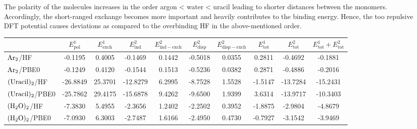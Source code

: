 \documentclass[a4paper,12pt, parskip=half]{scrartcl}
\newcommand{\m}[1]{\mathrm{#1}}
\begin{document}
The polarity of the molecules increases in the order argon < water < uracil leading to shorter distances between the monomers. Accordingly, the short-ranged exchange becomes more important and heavily contributes to the binding energy. Hence, the too repulsive DFT potential causes deviations as compared to the overbinding HF in the above-mentioned order.
%
\begin{table}
	\centering
	\label{tab:noncov}
	\begin{adjustbox}{width=\columnwidth,center}
		\begin{tabular}{l|ccccccccc}
			\toprule
			                        & $ E^1_\m{pol} $ & $ E^1_\m{exch} $ & $ E^2_\m{ind} $ & $ E^2_\m{ind-exch} $ & $ E^2_\m{disp} $ & $ E^2_\m{disp-exch} $ & $ E^1_\m{tot} $ & $ E^2_\m{tot} $ & $ E^1_\m{tot} + E^2_\m{tot} $ \\
			\midrule
			$ \ce{Ar2} $/HF         & -0.1195         & 0.4005           & -0.1469         & 0.1442               & -0.5018          & 0.0355                & 0.2811          & -0.4692         & -0.1881                       \\
			$ \ce{Ar2} $/PBE0       & -0.1249         & 0.4120           & -0.1544         & 0.1513               & -0.5236          & 0.0382                & 0.2871          & -0.4886         & -0.2016                       \\
			$ \ce{(Uracil)2} $/HF   & -26.8849        & 25.3701          & -12.8279        & 6.2995               & -8.7528          & 1.5528                & -1.5147         & -13.7284        & -15.2431                      \\
			$ \ce{(Uracil)2} $/PBE0 & -25.7862        & 29.4175          & -15.6878        & 9.4262               & -9.6500          & 1.9399                & 3.6314          & -13.9717        & -10.3403                      \\
			$ \ce{(H2O)2} $/HF      & -7.3830         & 5.4955           & -2.3656         & 1.2402               & -2.2502          & 0.3952                & -1.8875         & -2.9804         & -4.8679                       \\
			$ \ce{(H2O)2} $/PBE0    & -7.0930         & 6.3003           & -2.7487         & 1.6166               & -2.4950          & 0.4730                & -0.7927         & -3.1542         & -3.9469                       \\
			\bottomrule
		\end{tabular}
	\end{adjustbox}
\end{table}
\end{document}
